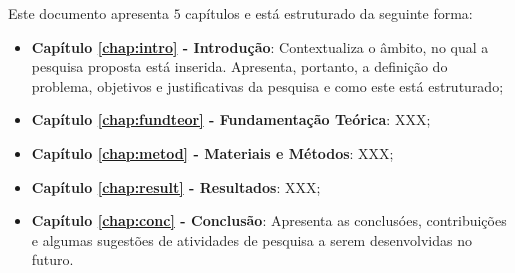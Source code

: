 Este documento apresenta $5$ capítulos e está estruturado da seguinte forma:

\begin{itemize}

  \item \textbf{Capítulo \ref{chap:intro} - Introdução}: Contextualiza o âmbito, no qual a pesquisa proposta está inserida. Apresenta, portanto, a definição do problema, objetivos e justificativas da pesquisa e como este \thetypeworkthree está estruturado;
  \item \textbf{Capítulo \ref{chap:fundteor} - Fundamentação Teórica}: XXX;
  \item \textbf{Capítulo \ref{chap:metod} - Materiais e Métodos}: XXX;
  \item \textbf{Capítulo \ref{chap:result} - Resultados}: XXX;
  \item \textbf{Capítulo \ref{chap:conc} - Conclusão}: Apresenta as conclusóes, contribuições e algumas sugestões de atividades de pesquisa a serem desenvolvidas no futuro.

\end{itemize}
